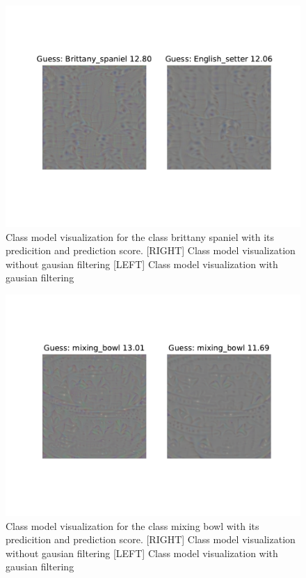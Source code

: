 \documentclass{article}
\begin{document}
\begin{figure}[h]
    \begin{center}
        \includegraphics{../Task2/Figures/215_visualized.pdf}
        \caption{Class model visualization for the class brittany spaniel with its predicition and prediction score. [RIGHT] Class model visualization without gausian filtering [LEFT] Class model visualization with gausian filtering}
        \label{fig::classModel215}
    \end{center}
\end{figure}

\begin{figure}[h]
    \begin{center}
        \includegraphics{../Task2/Figures/659_visualized.pdf}
        \caption{Class model visualization for the class mixing bowl with its predicition and prediction score. [RIGHT] Class model visualization without gausian filtering [LEFT] Class model visualization with gausian filtering}
        \label{fig::classModel659}
    \end{center}
\end{figure}
\end{document}
